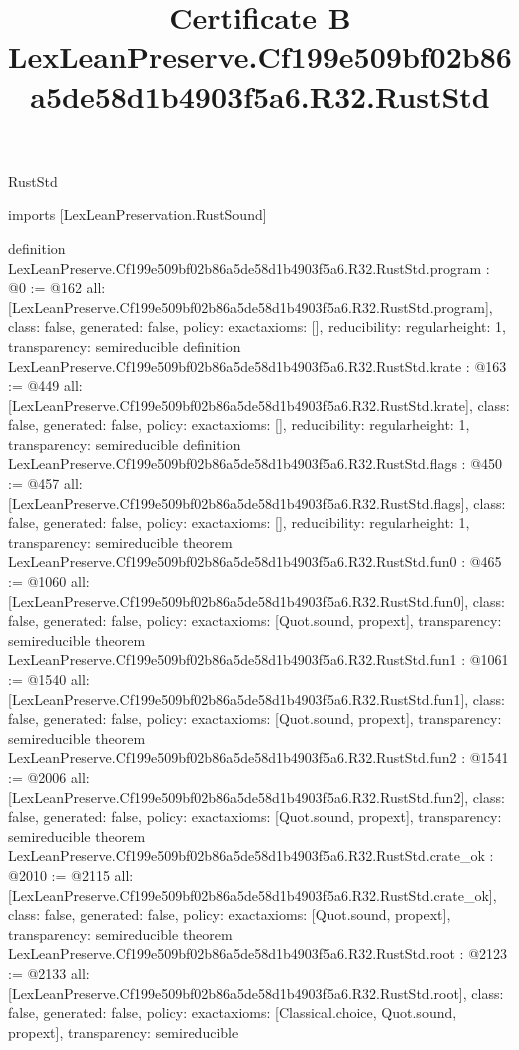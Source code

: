 \begin{lexlean}{RustStd}
\title{Certificate B LexLeanPreserve.Cf199e509bf02b86a5de58d1b4903f5a6.R32.RustStd}
\begin{coremodule}
imports [LexLeanPreservation.RustSound]

definition LexLeanPreserve.Cf199e509bf02b86a5de58d1b4903f5a6.R32.RustStd.program : @0 := @162 {
  all: [LexLeanPreserve.Cf199e509bf02b86a5de58d1b4903f5a6.R32.RustStd.program],
  class: false,
  generated: false,
  policy: exact{axioms: []},
  reducibility: regular{height: 1},
  transparency: semireducible
}
definition LexLeanPreserve.Cf199e509bf02b86a5de58d1b4903f5a6.R32.RustStd.krate : @163 := @449 {
  all: [LexLeanPreserve.Cf199e509bf02b86a5de58d1b4903f5a6.R32.RustStd.krate],
  class: false,
  generated: false,
  policy: exact{axioms: []},
  reducibility: regular{height: 1},
  transparency: semireducible
}
definition LexLeanPreserve.Cf199e509bf02b86a5de58d1b4903f5a6.R32.RustStd.flags : @450 := @457 {
  all: [LexLeanPreserve.Cf199e509bf02b86a5de58d1b4903f5a6.R32.RustStd.flags],
  class: false,
  generated: false,
  policy: exact{axioms: []},
  reducibility: regular{height: 1},
  transparency: semireducible
}
theorem LexLeanPreserve.Cf199e509bf02b86a5de58d1b4903f5a6.R32.RustStd.fun0 : @465 := @1060 {
  all: [LexLeanPreserve.Cf199e509bf02b86a5de58d1b4903f5a6.R32.RustStd.fun0],
  class: false,
  generated: false,
  policy: exact{axioms: [Quot.sound, propext]},
  transparency: semireducible
}
theorem LexLeanPreserve.Cf199e509bf02b86a5de58d1b4903f5a6.R32.RustStd.fun1 : @1061 := @1540 {
  all: [LexLeanPreserve.Cf199e509bf02b86a5de58d1b4903f5a6.R32.RustStd.fun1],
  class: false,
  generated: false,
  policy: exact{axioms: [Quot.sound, propext]},
  transparency: semireducible
}
theorem LexLeanPreserve.Cf199e509bf02b86a5de58d1b4903f5a6.R32.RustStd.fun2 : @1541 := @2006 {
  all: [LexLeanPreserve.Cf199e509bf02b86a5de58d1b4903f5a6.R32.RustStd.fun2],
  class: false,
  generated: false,
  policy: exact{axioms: [Quot.sound, propext]},
  transparency: semireducible
}
theorem LexLeanPreserve.Cf199e509bf02b86a5de58d1b4903f5a6.R32.RustStd.crate_ok : @2010 := @2115 {
  all: [LexLeanPreserve.Cf199e509bf02b86a5de58d1b4903f5a6.R32.RustStd.crate_ok],
  class: false,
  generated: false,
  policy: exact{axioms: [Quot.sound, propext]},
  transparency: semireducible
}
theorem LexLeanPreserve.Cf199e509bf02b86a5de58d1b4903f5a6.R32.RustStd.root : @2123 := @2133 {
  all: [LexLeanPreserve.Cf199e509bf02b86a5de58d1b4903f5a6.R32.RustStd.root],
  class: false,
  generated: false,
  policy: exact{axioms: [Classical.choice, Quot.sound, propext]},
  transparency: semireducible
}


\end{coremodule}
\end{lexlean}
